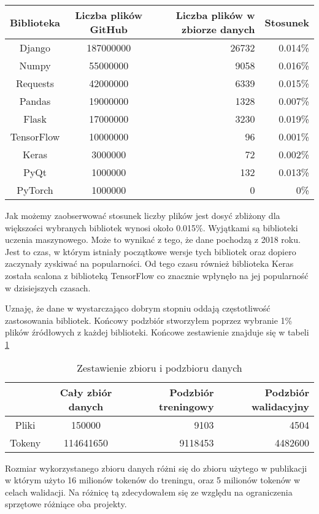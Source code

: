 \begin{description}
\begin{table}[!h]
    \begin{tabular} {| c | c | r | r |} \hline
        Biblioteka & Liczba plików GitHub & Liczba plików w zbiorze danych & Stosunek\\\hline\hline
        Django & 187000000 & 26732 & 0.014\% \\\hline
        Numpy & 55000000 & 9058 & 0.016\% \\ \hline
        Requests & 42000000 & 6339 & 0.015\%\\ \hline
        Pandas & 19000000 & 1328 & 0.007\%\\ \hline
        Flask & 17000000 & 3230 & 0.019\% \\ \hline
        TensorFlow & 10000000 & 96 & 0.001\%\\ \hline
        Keras & 3000000& 72 & 0.002\%\\ \hline
        PyQt & 1000000 & 132 & 0.013\%\\ \hline
        PyTorch & 1000000 & 0 & 0\%\\ \hline
    \end{tabular}
\end{table}

Jak możemy zaobserwować stosunek liczby plików jest dosyć zbliżony dla większości wybranych bibliotek wynosi około 0.015\%. Wyjątkami są 
biblioteki uczenia maszynowego. Może to wynikać z tego, że dane pochodzą z 2018 roku. Jest to czas, w którym istniały początkowe wersje tych bibliotek oraz dopiero
zaczynały zyskiwać na popularności. Od tego czasu również biblioteka Keras została scalona z biblioteką TensorFlow co znacznie wpłynęło na jej popularność w dzisiejszych czasach. 

Uznaję, że dane w wystarczająco dobrym stopniu oddają częstotliwość zastosowania bibliotek. Końcowy podzbiór stworzyłem poprzez wybranie 1\% plików źródłowych z każdej biblioteki. 
Końcowe zestawienie znajduje się w tabeli \ref{tab:dataset-compare-github}

\begin{table}[!h] \centering
    \caption{Zestawienie zbioru i podzbioru danych}
    \label{tab:dataset-compare-github}
    
    \begin{tabular} {| c | c | r | r |} \hline
         & Cały zbiór danych & Podzbiór treningowy & Podzbiór walidacyjny \\\hline\hline
        Pliki & 150000 & 9103 & 4504 \\\hline
        Tokeny & 114641650 & 9118453 & 4482600 \\ \hline
    \end{tabular}
\end{table}
Rozmiar wykorzystanego zbioru danych różni się do zbioru użytego w publikacji \cite{hellendoorn} w którym użyto 16 milionów tokenów do treningu, oraz 
5 milionów tokenów w celach walidacji. Na różnicę tą zdecydowałem się ze względu na ograniczenia sprzętowe różniące oba projekty. \\



\end{description}

